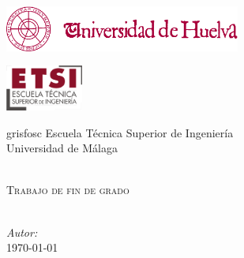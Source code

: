 \begin{titlepage}
\begin{center}

\begin{minipage}{0.49\linewidth}
\begin{flushleft}
\includegraphics[height=1.5cm]{./images/logo_uhu}
\end{flushleft}
\end{minipage}
\begin{minipage}{0.49\linewidth}
\begin{flushright}
\includegraphics[height=1.5cm]{./images/logo_etsi}
\end{flushright}
\end{minipage}

\vspace{2cm}

\begin{color}{grisfosc}
\large
Escuela Técnica Superior de Ingeniería\\[0.2cm]
Universidad de Málaga\\[1.9cm]
\end{color}

{\LARGE \bfseries \titulo}\\[1.5cm]
\textsc{\large Trabajo de fin de grado}\\[0.4cm]
\textcolor{grisclar}{\large\titulacion}\\[5.0cm]

\begin{flushright} \large
\emph{Autor:} \autor\\[0.4cm]
\today
\end{flushright}


\end{center}

\end{titlepage}
